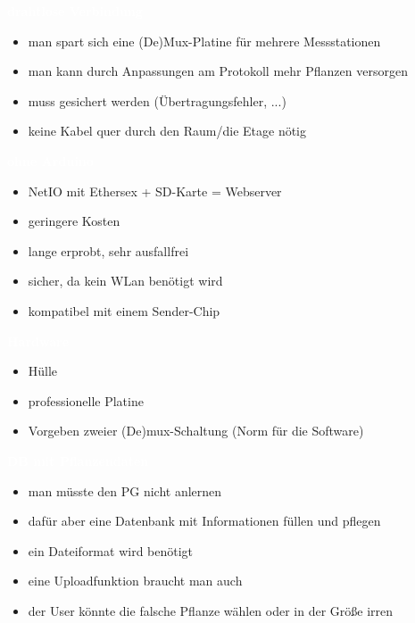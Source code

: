 \documentclass[bigger]{beamer}
\newcommand{\topic}[1]{{\huge{\textcolor{white}{\textbf{#1}}}}}
\begin{document}
\begin{frame}{\topic{drahtlose Verbindung}}
	\begin{itemize}
		\item man spart sich eine (De)Mux-Platine für mehrere Messstationen
		\item man kann durch Anpassungen am Protokoll mehr Pflanzen versorgen
		\item muss gesichert werden (Übertragungsfehler, ...)
		\item keine Kabel quer durch den Raum/die Etage nötig
	\end{itemize}
\end{frame}

\begin{frame}{\topic{ohne Arduino}}
	\begin{itemize}
		\item NetIO mit Ethersex + SD-Karte = Webserver
		\item geringere Kosten
		\item lange erprobt, sehr ausfallfrei
		\item sicher, da kein WLan benötigt wird
		\item kompatibel mit einem Sender-Chip
	\end{itemize}
\end{frame}

\begin{frame}{\topic{Hardware}}
	\begin{itemize}
		\item Hülle
		\item professionelle Platine
		\item Vorgeben zweier (De)mux-Schaltung (Norm für die Software)
	\end{itemize}
\end{frame}

\begin{frame}{\topic{DB mit Pflanzendaten}}
	\begin{itemize}
		\item man müsste den PG nicht anlernen
		\item dafür aber eine Datenbank mit Informationen füllen und pflegen
		\item ein Dateiformat wird benötigt
		\item eine Uploadfunktion braucht man auch
		\item der User könnte die falsche Pflanze wählen oder in der Größe irren
	\end{itemize}
\end{frame}
\end{document}
